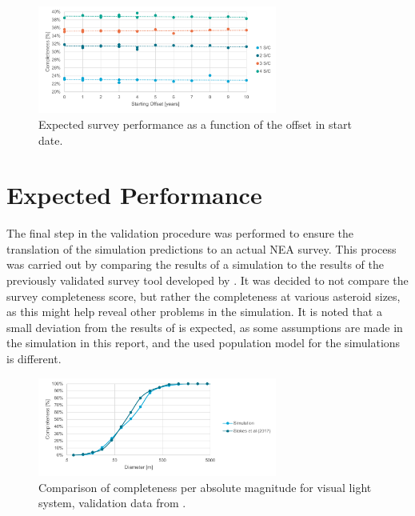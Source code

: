 \begin{figure}[htbp]
 \centering
 \includegraphics[width=0.7\textwidth]{img/validation_starting_year.pdf}
 \caption{Expected survey performance as a function of the offset in start date.}
 \label{fig:validation_starting_year}
\end{figure}



\section{Expected Performance}
\label{sec:vvperformance}

The final step in the validation procedure was performed to ensure the translation of the simulation predictions to an actual NEA survey. This process was carried out by comparing the results of a simulation to the results of the previously validated survey tool developed by \cite{2017NEOSDT}. It was decided to not compare the survey completeness score, but rather the completeness at various asteroid sizes, as this might help reveal other problems in the simulation. It is noted that a small deviation from the results of \cite{2017NEOSDT} is expected, as some assumptions are made in the simulation in this report, and the used population model for the simulations is different.

\begin{figure}[htbp]
 \centering
 \includegraphics[width=0.7\textwidth]{img/validation_completeness_vis.pdf}
 \caption{Comparison of completeness per absolute magnitude for visual light system, validation data from \cite{2017NEOSDT}.}
 \label{fig:validation_completeness_vis}
\end{figure}


